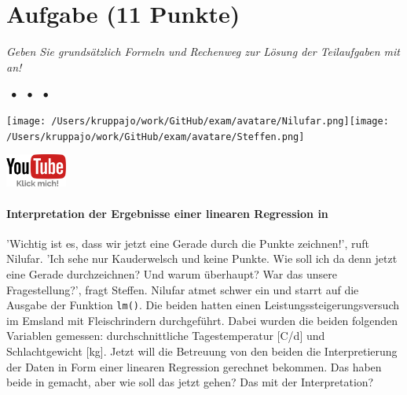 \documentclass[a4paper, 9pt]{scrartcl}\usepackage[]{graphicx}\usepackage[]{xcolor}
\begin{document}
\section{Aufgabe \hfill (11 Punkte)}

\textit{Geben Sie grundsätzlich Formeln und Rechenweg zur Lösung der Teilaufgaben mit an!} \\[1Ex]
 

 
\ifcollection
\begin{flushright}
\tiny\vspace{-3Ex}
\textbf{\examinhaltstart}
\exammodulestat $\;\bullet$
\exammodulestatbbv $\;\bullet$
\exammodulestatversuch $\;\bullet$
\exammodulebiostat
\vspace{-4Ex}
\end{flushright}
\begin{minipage}[t]{0.5\textwidth}
\texttt{[image: /Users/kruppajo/work/GitHub/exam/avatare/Nilufar.png]}\hspace{-4mm}\texttt{[image: /Users/kruppajo/work/GitHub/exam/avatare/Steffen.png]}
\end{minipage}
\begin{minipage}[t]{0.5\textwidth}
\hfill
\href{https://youtu.be/tNNzcndrpSk}{\includegraphics[width = 2cm]{img/youtube}}
\end{minipage}
\fi



\ifcollection
\paragraph{Interpretation der Ergebnisse einer linearen Regression in \Rlogo}
\fi

'Wichtig ist es, dass wir jetzt eine Gerade durch die Punkte zeichnen!', ruft Nilufar. 'Ich sehe nur Kauderwelsch und keine Punkte. Wie soll ich da denn jetzt eine Gerade durchzeichnen? Und warum überhaupt? War das unsere Fragestellung?', fragt Steffen. Nilufar atmet schwer ein und starrt auf die \Rlogo Ausgabe der Funktion \texttt{lm()}. Die beiden hatten einen Leistungssteigerungsversuch im Emsland mit Fleischrindern durchgeführt. Dabei wurden die beiden folgenden Variablen gemessen: durchschnittliche Tagestemperatur [C/d] und Schlachtgewicht [kg]. Jetzt will die Betreuung von den beiden die Interpretierung der Daten in Form einer linearen Regression gerechnet bekommen. Das haben beide in \Rlogo gemacht, aber wie soll das jetzt gehen? Das mit der Interpretation?
\end{document}

